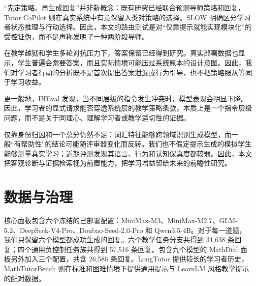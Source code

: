 \documentclass[11pt,a4paper,UTF8]{ctexart}
\begin{document}
“先定策略、再生成回复”并非新概念：既有研究已经联合预测导师策略和回复\citep{wang-etal-2023-strategize}，Tutor CoPilot 则在真实系统中有意保留人类对策略的选择\citep{wang-etal-2025-tutor-copilot}。SLOW 明确区分学习者状态推理与行动选择\citep{wei-etal-2026-slow}。因此，本文的路由测试是对“仅靠提示就能实现模块化”的受控证伪，而不是声称发明了一种两阶段导师。

在教学越狱和学生多轮对抗压力下，答案保留已经得到研究\citep{zhao-etal-2026-shape,zhao-etal-2026-answer-leakage}。真实部署数据也显示，学生普遍会索要答案，而且实际情境可能压过系统原本的设计意图\citep{kobler-etal-2026-students}。因此，我们对学习者行动的分析既不是首次提出答案泄漏或行为引导，也不把策略服从等同于学习收益。

更一般地，IHEval 发现，当不同层级的指令发生冲突时，模型表现会明显下降\citep{zhang-etal-2025-iheval}。因此，学习者的显式请求能否穿透系统层的教学策略条款，本质上是一个指令层级问题，而不是关于同理心、理解学习者或教学适切性的证据。

仅靠身份归因和一个总分仍然不足：词汇特征能够跨领域识别生成模型，而一般“有帮助性”的结论可能随评审器变化而反转\citep{mcgovern-etal-2025-fingerprints,fan-etal-2026-helpfulness}。我们也不假定提示生成的模拟学生能够测量真实学习；近期评测发现其语言、行为和认知保真度都较弱\citep{scarlatos-etal-2026-simulated}。因此，本文把客观诊断与证据检索视为前置能力，把学习增益留给未来的前瞻性研究。

\section{数据与治理}

核心面板包含六个冻结的已部署配置：MiniMax-M3、MiniMax-M2.7、GLM-5.2、DeepSeek-V4-Pro、Doubao-Seed-2.0-Pro 和 Qwen3.5-4B。对于每一道题，我们只保留六个模型都成功生成的回复。六个教学任务分支共得到 31,638 条回复；四个通用负控制任务族共得到 57,516 条回复。包含九个模型的 MathDial 面板另外加入三个配置，共含 26,586 条回复。LongTutor 提供较长的学习者历史，MathTutorBench 则在标准和困难情境下提供通用提示与 LearnLM 风格教学提示的配对数据。
\end{document}
